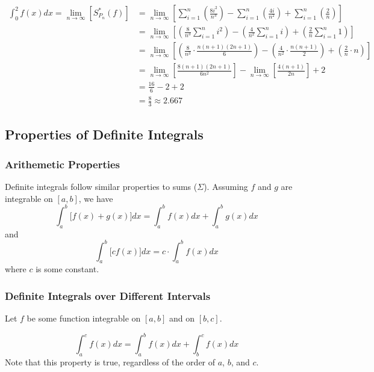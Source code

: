 \documentclass[10pt]{article}
\begin{document}
$$
    \begin{aligned}
         \int_0^2f(x)dx=\lim_{n\to\infty}\left[S_{P_n}^*(f)\right]&=\lim_{n\to\infty}\left[\sum_{i=1}^n\left(\frac{8i^2}{n^3}\right)-\sum_{i=1}^n\left(\frac{4i}{n^2}\right)+\sum_{i=1}^n\left(\frac{2}{n}\right)\right] \\
         &=\lim_{n\to\infty}\left[
            \left(\frac{8}{n^3}\sum_{i=1}^ni^2\right) - 
            \left(\frac{4}{n^2}\sum_{i=1}^ni\right) +
            \left(\frac{2}{n}\sum_{i=1}^n1\right)
        \right] \\
        &=\lim_{n\to\infty}\left[
            \left(\frac{8}{n^3}\cdot\frac{n(n+1)(2n+1)}{6}\right) -
            \left(\frac{4}{n^2}\cdot\frac{n(n+1)}{2}\right) +
            \left(\frac{2}{n}\cdot n\right)
        \right] \\
        &=\lim_{n\to\infty}\left[\frac{8(n+1)(2n+1)}{6n^2}\right]-\lim_{n\to\infty}\left[\frac{4(n+1)}{2n}\right]+2 \\
        &=\frac{16}{6}-2+2 \\ 
        &=\frac{8}{3}\approx2.667
    \end{aligned}
$$
\newpage
\subsection{Properties of Definite Integrals}
\subsubsection{Arithemetic Properties}
Definite integrals follow similar properties to sums ($\Sigma$). Assuming $f$ and $g$ are integrable on $[a,b]$, we have
$$
    \int_a^b\big[f(x)+g(x)\big]dx=\int_a^bf(x)dx+\int_a^bg(x)dx
$$
and
$$
    \int_a^b\big[cf(x)\big]dx=c\cdot\int_a^bf(x)dx
$$
where $c$ is some constant.
\subsubsection{Definite Integrals over Different Intervals}
Let $f$ be some function integrable on $[a,b]$ and on $[b,c]$.
\begin{center}
\end{center}
$$
    \int_a^cf(x)dx=\int_a^bf(x)dx+\int_b^cf(x)dx
$$
Note that this property is true, regardless of the order of $a$, $b$, and $c$.
\end{document}
